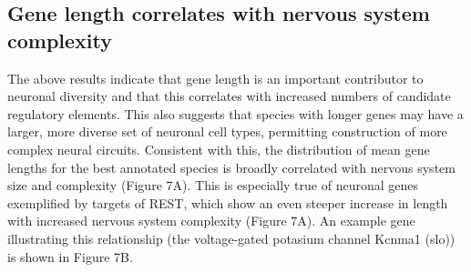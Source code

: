 \subsection{Gene length correlates with nervous system complexity}

The above results indicate that gene length is an important contributor to neuronal diversity and that this correlates with increased numbers of candidate regulatory elements. This also suggests that species with longer genes may have a larger, more diverse set of neuronal cell types, permitting construction of more complex neural circuits. Consistent with this, the distribution of mean gene lengths for the best annotated species is broadly correlated with nervous system size and complexity (Figure 7A). This is especially true of neuronal genes exemplified by targets of REST, which show an even steeper increase in length with increased nervous system complexity (Figure 7A). An example gene illustrating this relationship (the voltage-gated potasium channel Kcnma1 (slo)) is shown in Figure 7B. 
